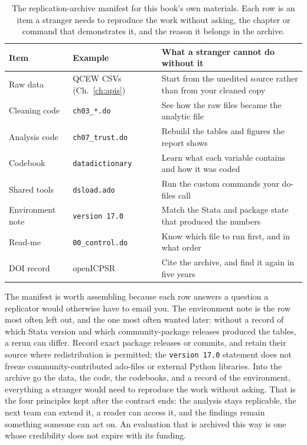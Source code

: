 \documentclass[
    a4paper,
    fontsize=10pt,
    twoside=true,
    numbers=noenddot,
]{kaobook}
\begin{document}
\begin{table}[htbp]
\centering
\caption[A replication-archive manifest]{The replication-archive manifest for this book's own materials. Each row is an item a stranger needs to reproduce the work without asking, the chapter or command that demonstrates it, and the reason it belongs in the archive.}
\label{tab:manifest}
\begin{tabular}{@{}p{3.0cm}p{3.4cm}p{8.4cm}@{}}
\hline
Item & Example & What a stranger cannot do without it \\
\hline
Raw data          & QCEW CSVs (Ch.~\ref{ch:apis})  & Start from the unedited source rather than from your cleaned copy \\
Cleaning code     & \texttt{ch03\_*.do}  & See how the raw files became the analytic file \\
Analysis code     & \texttt{ch07\_trust.do} & Rebuild the tables and figures the report shows \\
Codebook          & \texttt{datadictionary}  & Learn what each variable contains and how it was coded \\
Shared tools      & \texttt{dsload.ado}  & Run the custom commands your do-files call \\
Environment note  & \texttt{version 17.0} & Match the Stata and package state that produced the numbers \\
Read-me           & \texttt{00\_control.do} & Know which file to run first, and in what order \\
DOI record        & openICPSR            & Cite the archive, and find it again in five years \\
\hline
\end{tabular}
\end{table}

The manifest is worth assembling because each row answers a question a replicator would otherwise have to email you. The environment note is the row most often left out, and the one most often wanted later: without a record of which Stata version and which community-package releases produced the tables, a rerun can differ. Record exact package releases or commits, and retain their source where redistribution is permitted; the \texttt{version 17.0} statement does not freeze community-contributed ado-files or external Python libraries. Into the archive go the data, the code, the codebooks, and a record of the environment, everything a stranger would need to reproduce the work without asking. That is the four principles kept after the contract ends: the analysis stays replicable, the next team can extend it, a reader can access it, and the findings remain something someone can act on. An evaluation that is archived this way is one whose credibility does not expire with its funding.
\end{document}

